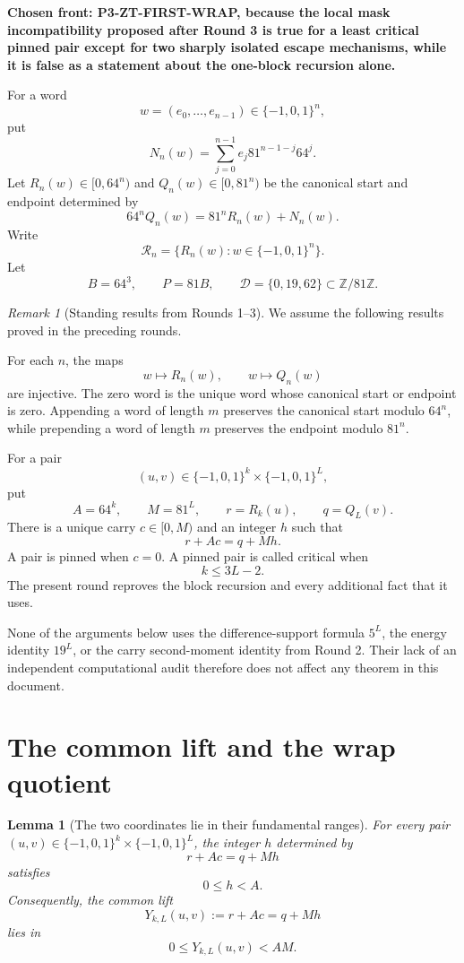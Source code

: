 \documentclass[11pt]{article}
\newtheorem{lemma}[theorem]{Lemma}
\theoremstyle{remark}
\newtheorem{remark}[theorem]{Remark}
\newcommand{\Z}{\mathbb{Z}}
\newcommand{\E}{\{-1,0,1\}}
\newcommand{\Rset}{\mathcal{R}}
\newcommand{\Dset}{\mathcal{D}}
\begin{document}
\textbf{Chosen front: P3-ZT-FIRST-WRAP, because the local mask incompatibility proposed after Round 3 is true for a least critical pinned pair except for two sharply isolated escape mechanisms, while it is false as a statement about the one-block recursion alone.}

For a word
\[
w=(e_0,\ldots,e_{n-1})\in\E^n,
\]
put
\[
N_n(w)=
\sum_{j=0}^{n-1}
e_j81^{n-1-j}64^j.
\]
Let \(R_n(w)\in[0,64^n)\) and \(Q_n(w)\in[0,81^n)\) be the canonical start and endpoint determined by
\[
64^nQ_n(w)=81^nR_n(w)+N_n(w).
\]
Write
\[
\Rset_n=\{R_n(w):w\in\E^n\}.
\]
Let
\[
B=64^3,
\qquad
P=81B,
\qquad
\Dset=\{0,19,62\}\subset\Z/81\Z.
\]

\begin{remark}[Standing results from Rounds 1--3]
We assume the following results proved in the preceding rounds.

For each \(n\), the maps
\[
w\longmapsto R_n(w),
\qquad
w\longmapsto Q_n(w)
\]
are injective.  The zero word is the unique word whose canonical start or endpoint is zero.  Appending a word of length \(m\) preserves the canonical start modulo \(64^n\), while prepending a word of length \(m\) preserves the endpoint modulo \(81^n\).

For a pair
\[
(u,v)\in\E^k\times\E^L,
\]
put
\[
A=64^k,
\qquad
M=81^L,
\qquad
r=R_k(u),
\qquad
q=Q_L(v).
\]
There is a unique carry \(c\in[0,M)\) and an integer \(h\) such that
\[
r+Ac=q+Mh.
\]
A pair is pinned when \(c=0\).  A pinned pair is called critical when
\[
k\le3L-2.
\]
The present round reproves the block recursion and every additional fact that it uses.
\end{remark}

None of the arguments below uses the difference-support formula \(5^L\), the energy identity \(19^L\), or the carry second-moment identity from Round 2.  Their lack of an independent computational audit therefore does not affect any theorem in this document.

\section{The common lift and the wrap quotient}

\begin{lemma}[The two coordinates lie in their fundamental ranges]
\label{lem:ranges}
For every pair \((u,v)\in\E^k\times\E^L\), the integer \(h\) determined by
\[
r+Ac=q+Mh
\]
satisfies
\[
0\le h<A.
\]
Consequently, the common lift
\[
Y_{k,L}(u,v):=r+Ac=q+Mh
\]
lies in
\[
0\le Y_{k,L}(u,v)<AM.
\]
\end{lemma}
\end{document}
